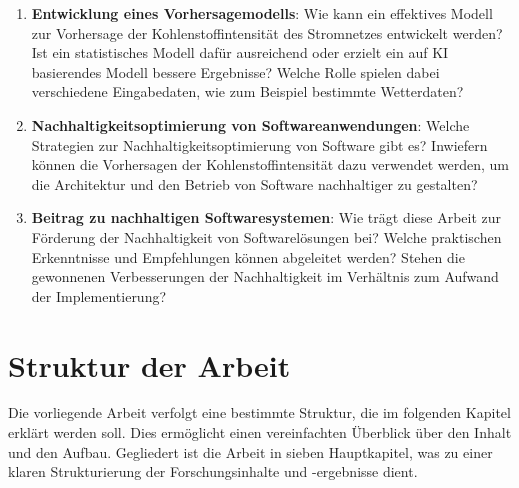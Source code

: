 \begin{enumerate}
 \item \textbf{Entwicklung eines Vorhersagemodells}: Wie kann ein effektives Modell zur Vorhersage der Kohlenstoffintensität des Stromnetzes entwickelt werden?
 Ist ein statistisches Modell dafür ausreichend oder erzielt ein auf \ac{KI} basierendes Modell bessere Ergebnisse?
 Welche Rolle spielen dabei verschiedene Eingabedaten, wie zum Beispiel bestimmte Wetterdaten?
 \item \textbf{Nachhaltigkeitsoptimierung von Softwareanwendungen}: Welche Strategien zur Nachhaltigkeitsoptimierung von Software gibt es?
 Inwiefern können die Vorhersagen der Kohlenstoffintensität dazu verwendet werden, um die Architektur und den Betrieb von Software nachhaltiger zu gestalten?
 \item \textbf{Beitrag zu nachhaltigen Softwaresystemen}: Wie trägt diese Arbeit zur Förderung der Nachhaltigkeit von Softwarelösungen bei?
 Welche praktischen Erkenntnisse und Empfehlungen können abgeleitet werden?
 Stehen die gewonnenen Verbesserungen der Nachhaltigkeit im Verhältnis zum Aufwand der Implementierung?
\end{enumerate}
%
\section{Struktur der Arbeit}
Die vorliegende Arbeit verfolgt eine bestimmte Struktur, die im folgenden Kapitel erklärt werden soll.
Dies ermöglicht einen vereinfachten Überblick über den Inhalt und den Aufbau.
Gegliedert ist die Arbeit in sieben Hauptkapitel, was zu einer klaren Strukturierung der Forschungsinhalte und -ergebnisse dient.

